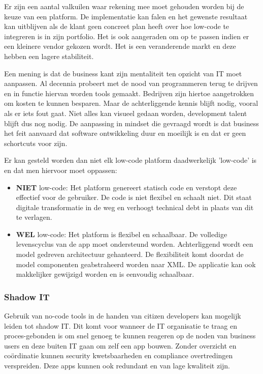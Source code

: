 Er zijn een aantal valkuilen waar rekening mee moet gehouden worden bij de keuze van een platform. De implementatie kan falen en het gewenste resultaat kan uitblijven als de klant geen concreet plan heeft over hoe low-code te integreren is in zijn portfolio. Het is ook aangeraden om op te passen indien er een kleinere vendor gekozen wordt. Het is een veranderende markt en deze hebben een lagere stabiliteit. \autocite{Richardson2016}

Een mening is dat de business kant zijn mentaliteit ten opzicht van IT moet aanpassen. Al decennia probeert met de nood van programmeren terug te drijven en in functie hiervan worden tools gemaakt. Bedrijven zijn hiertoe aangetrokken om kosten te kunnen besparen. Maar de achterliggende kennis blijft nodig, vooral als er iets fout gaat. Niet alles kan visueel gedaan worden, development talent blijft dus nog nodig. De aanpassing in mindset die gevraagd wordt is dat business het feit aanvaard dat software ontwikkeling duur en moeilijk is en dat er geen schortcuts voor zijn. \autocite{Reselman2018}

Er kan gesteld worden dan niet elk low-code platform daadwerkelijk 'low-code' is en dat men hiervoor moet oppassen:
\begin{itemize}
    \item \textbf{NIET} low-code: Het platform genereert statisch code en verstopt deze effectief voor de gebruiker. De code is niet flexibel en schaalt niet. Dit staat digitale transformatie in de weg en verhoogt technical debt in plaats van dit te verlagen.
    \item \textbf{WEL} low-code: Het platform is flexibel en schaalbaar. De volledige levenscyclus van de app moet ondersteund worden. Achterliggend wordt een model gedreven architectuur gehanteerd. De flexibiliteit komt doordat de model componenten geabstraheerd worden naar XML. De applicatie kan ook makkelijker gewijzigd worden en is eenvoudig schaalbaar.
\end{itemize} \autocite{Shiah2018}

\subsubsection{Shadow IT}

Gebruik van no-code tools in de handen van citizen developers kan mogelijk leiden tot shadow IT. Dit komt voor wanneer de IT organisatie te traag en proces-gebonden is om snel genoeg te kunnen reageren op de noden van business users en deze buiten IT gaan om zelf een app bouwen. Zonder overzicht en coördinatie kunnen security kwetsbaarheden en compliance overtredingen verspreiden. Deze apps kunnen ook redundant en van lage kwaliteit zijn. \autocite{Bloomberg2017}

